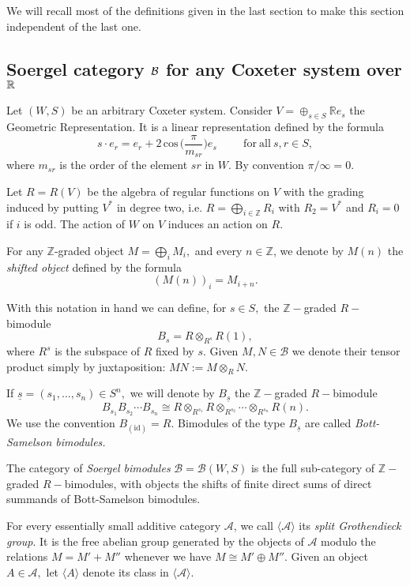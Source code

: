 \documentclass[12pt]{wart}
\theoremstyle{remark}
\begin{document}
We will recall most of  the definitions given  in the last section to make this section independent of the last one. 


\subsection{Soergel category $\mathcal B$ for any Coxeter system over $\mathbb R$}\label{any}
Let $(W,S)$ be an arbitrary Coxeter system. Consider $V=\oplus_{s\in S} \mathbb{R}e_s$ the Geometric Representation. It is a linear representation defined by the formula 
$$s\cdot e_r=  e_r+2\, \mathrm{cos}\, \biggl(\frac{\pi}{m_{sr}}\biggr) e_s \hspace{1cm}\mathrm{for\ all\ }s, r \in S,$$
where $m_{sr}$ is the order of the element $sr$ in $W.$ By convention $\pi/\infty =0.$


Let $R=R(V)$\label{d1}  be the algebra of regular functions on $V$ with  the grading induced by putting $V^*$ in degree two, i.e. $R=\bigoplus_{i\in
\mathbb{Z}}R_i$ with  $R_2 = V^*$ and $R_i=0$ if $i$ is odd. The 
action of $W$ on $V$ induces an action on $R$.

For any $\mathbb{Z}$-graded object $M=\bigoplus_i M_i,$ and every  $n\in \mathbb{Z}$, we denote by $M(n)$ the \emph{shifted object} defined by the formula $$(M(n))_i=M_{i+n}.$$ 



 With this notation in hand we can define, for $s\in S,$  the  $\mathbb{Z}-$graded  $R-$bimodule $$B_s=R\otimes_{R^s} R(1),$$ where $R^s$ is the subspace of $R$ fixed by $s$.   
Given $M,N\in \mathcal{B}$ we denote  their tensor product simply by juxtaposition: $M N := M \otimes_R N$.

If $ \underline{s}=(s_1,\ldots, s_n)\in {S}^n,$ we will denote by $B_{\underline{s}}$ the  $\mathbb{Z}-$graded $R-$bimodule $${B}_{s_1}{B}_{s_2}\cdots {B}_{s_n}\cong {R}\otimes_{{R}^{s_1}}{R}\otimes_{{R}^{s_2}}\cdots \otimes_{{R}^{s_n}}{R}(n).$$ We use the convention $B_{(\mathrm{id})}=R.$ Bimodules of the type $B_{\underline{s}}$ are called  \emph{Bott-Samelson bimodules.}

 The category of  \textit{Soergel bimodules} $\mathcal{B}=\mathcal{B}(W,S)$ is the full sub-category  of $\mathbb{Z}-$graded $R-$bimodules, with objects the shifts of finite direct sums of direct summands of Bott-Samelson bimodules. 



For every essentially small additive category $\mathcal{A}$, we call  $\langle\mathcal{A}\rangle$ its \textit{split Grothendieck 
group}. It is the free abelian group generated by the objects of  $\mathcal{A}$ modulo the relations $M=M'+M''$ whenever we have $M\cong M'\oplus M''$. Given an object $A\in \mathcal{A},$ let  $\langle A \rangle$ denote its class in $ \langle \mathcal{A}
\rangle$.
\end{document}
